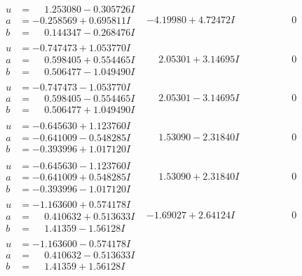 \documentclass[1p]{elsarticle_modified}
\theoremstyle{definition}
\begin{document}
$$\begin{array}{c|c|c}
\begin{aligned}
u &= \phantom{-}1.253080 - 0.305726 I \\
a &= -0.258569 + 0.695811 I \\
b &= \phantom{-}0.144347 - 0.268476 I\end{aligned}
 & -4.19980 + 4.72472 I & \phantom{-0.000000 } 0 \\ \hline\begin{aligned}
u &= -0.747473 + 1.053770 I \\
a &= \phantom{-}0.598405 + 0.554465 I \\
b &= \phantom{-}0.506477 - 1.049490 I\end{aligned}
 & \phantom{-}2.05301 + 3.14695 I & \phantom{-0.000000 } 0 \\ \hline\begin{aligned}
u &= -0.747473 - 1.053770 I \\
a &= \phantom{-}0.598405 - 0.554465 I \\
b &= \phantom{-}0.506477 + 1.049490 I\end{aligned}
 & \phantom{-}2.05301 - 3.14695 I & \phantom{-0.000000 } 0 \\ \hline\begin{aligned}
u &= -0.645630 + 1.123760 I \\
a &= -0.641009 - 0.548285 I \\
b &= -0.393996 + 1.017120 I\end{aligned}
 & \phantom{-}1.53090 - 2.31840 I & \phantom{-0.000000 } 0 \\ \hline\begin{aligned}
u &= -0.645630 - 1.123760 I \\
a &= -0.641009 + 0.548285 I \\
b &= -0.393996 - 1.017120 I\end{aligned}
 & \phantom{-}1.53090 + 2.31840 I & \phantom{-0.000000 } 0 \\ \hline\begin{aligned}
u &= -1.163600 + 0.574178 I \\
a &= \phantom{-}0.410632 + 0.513633 I \\
b &= \phantom{-}1.41359 - 1.56128 I\end{aligned}
 & -1.69027 + 2.64124 I & \phantom{-0.000000 } 0 \\ \hline\begin{aligned}
u &= -1.163600 - 0.574178 I \\
a &= \phantom{-}0.410632 - 0.513633 I \\
b &= \phantom{-}1.41359 + 1.56128 I\end{aligned}

\end{array}$$
\end{document}
